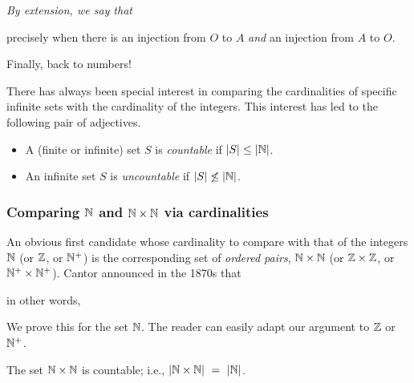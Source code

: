 \medskip

\noindent
{\em By extension, we say that \\
\hspace*{.35in}{\em Sets $O$ and $A$ have the same cardinality, denoted $|O| = |A|$}

\noindent
precisely when there is an injection from $O$ to $A$ {\em and} an injection from $A$ to $O$.}

\bigskip

Finally, back to numbers!

\smallskip

There has always been special interest in comparing the cardinalities of specific infinite sets with the cardinality of the integers.  This interest has led to the following pair of adjectives.

  
 
\begin{itemize}
\item
A (finite or infinite) set $S$ is {\it countable} if $|S| \leq |\mathbb{N}|$.

\item
An infinite set $S$ is {\it uncountable} if $|S| \not\leq |\mathbb{N}|$.
\end{itemize}

\subsubsection{Comparing $\mathbb{N}$ and $\mathbb{N} \times \mathbb{N}$ via cardinalities}
\label{sec:compare-NxN-N-via-card}

An obvious first candidate whose cardinality to compare with that of the integers $\mathbb{N}$ (or $\mathbb{Z}$, or $\mathbb{N}^+$) is the corresponding set of {\em ordered pairs}, $\mathbb{N} \times \mathbb{N}$ (or $\mathbb{Z} \times \mathbb{Z}$, or $\mathbb{N}^+ \times \mathbb{N}^+$).  Cantor announced in the 1870s that \\
\hspace*{.35in}{\em Pairing does not increase cardinality in infinite sets.}

\noindent
in other words, \\
\hspace*{.35in}{\em Pairing does not increase a set's order of infinity.}

\noindent
We prove this for the set $\mathbb{N}$.  The reader can easily adapt our argument to $\mathbb{Z}$ or $\mathbb{N}^+$.

\begin{prop}
\label{thm:|NxN|=|N|}
The set $\mathbb{N} \times \mathbb{N}$ is countable; i.e., $|\mathbb{N} \times \mathbb{N}| \ = \ |\mathbb{N}|$.
\end{prop}

